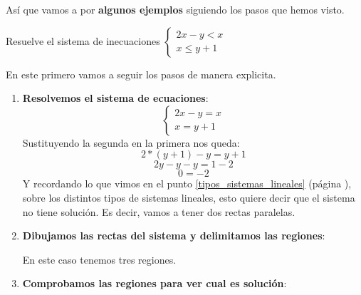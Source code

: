 \documentclass[a4paper,11pt,answers]{exam}
\begin{document}
Así que vamos a por \textbf{algunos ejemplos} siguiendo los pasos que hemos visto.
\begin{questions}
\question Resuelve el sistema de inecuaciones $
  \begin{cases}
    2x - y < x\\
    x \leq y + 1
  \end{cases}
  $
  \begin{solution}
    En este primero vamos a seguir los pasos de manera explicita.
    \begin{enumerate}
    \item \textbf{Resolvemos el sistema de ecuaciones}:
      \[
        \begin{cases}
          2x - y = x\\
          x = y +1
        \end{cases}
      \]
      Sustituyendo la segunda en la primera nos queda:
      \[2*(y + 1) - y = y + 1\]
      \[2y -y - y = 1- 2\]
      \[ 0 = -2\]
      Y recordando lo que vimos en el punto \ref{tipos_sistemas_lineales}
      (página \pageref{tipos_sistemas_lineales}), sobre los distintos tipos de sistemas lineales, esto
      quiere decir que el sistema no tiene solución. Es decir, vamos a tener dos rectas paralelas.
    \item \textbf{Dibujamos las rectas del sistema y delimitamos las regiones}:
      \begin{center}
      \end{center}
      En este caso tenemos tres regiones.
    \item \textbf{Comprobamos las regiones para ver cual es solución}:

\end{enumerate}
\end{solution}
\end{questions}
\end{document}
